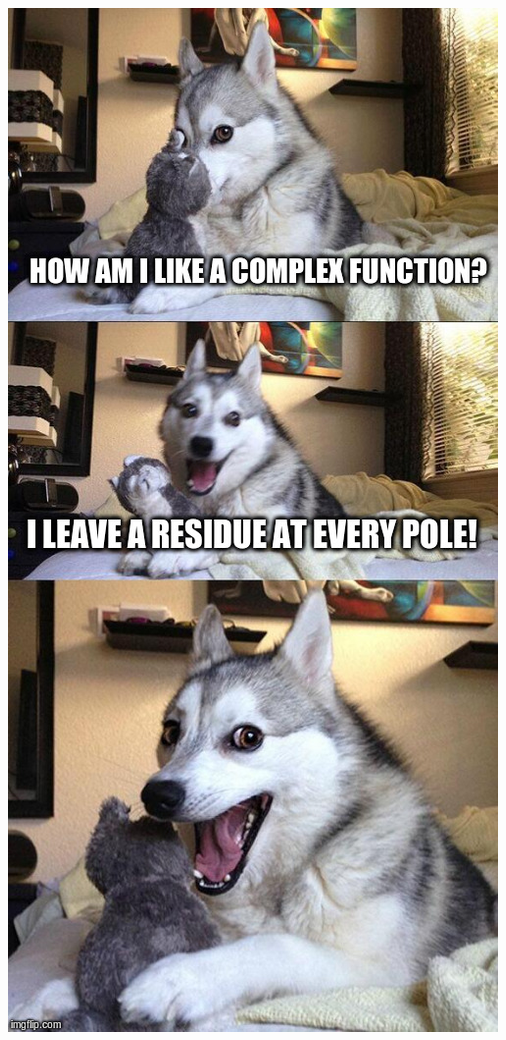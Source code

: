 \documentclass{beamer}
\begin{document}
\begin{frame}[plain]
\begin{columns}
\begin{column}{0.5\textwidth}
    \includegraphics[width=\textwidth,height=\textheight,keepaspectratio]{PolePun.jpg}

\end{column}
\end{columns}
\end{frame}
\end{document}
